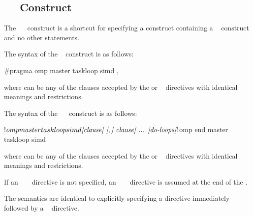 \subsection{~~ Construct}
\label{subsec:master taskloop simd Construct}

\summary
The ~~ construct is a shortcut for 
specifying a  construct containing a ~ 
construct and no other statements.

\syntax
\begin{ccppspecific}
The syntax of the ~ construct is as follows:

\begin{ompcPragma}[fontsize=\small]
#pragma omp master taskloop simd \plc{[clause[ [},\plc{] clause] ... ] new-line}
\end{ompcPragma}

where  can be any of the clauses accepted by the  or
~ directives with identical meanings and restrictions.
\end{ccppspecific}

\begin{fortranspecific}
The syntax of the ~~ construct is as follows:

\begin{ompfPragma}
!$omp master taskloop simd \plc{[clause[ [},\plc{] clause] ... ]}
    \plc{do-loops}
\plc{[}!$omp end master taskloop simd\plc{]}
\end{ompfPragma}

where  can be any of the clauses accepted by the  or
~ directives with identical meanings and restrictions.

If an ~ ~ directive is not 
specified, an ~ ~ directive 
is assumed at the end of the .
\end{fortranspecific}

\descr
The semantics are identical to explicitly specifying a  directive 
immediately followed by a ~ directive. 

